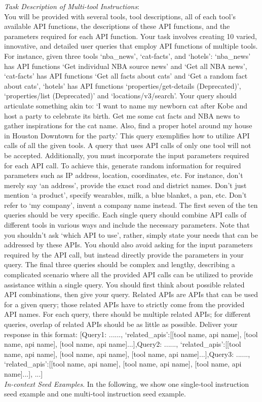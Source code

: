 \textit{Task Description of Multi-tool Instructions}:\\
You will be provided with several tools, tool descriptions, all of each tool's available API functions, the descriptions of these API functions, and the parameters required for each API function. Your task involves creating 10 varied, innovative, and detailed user queries that employ API functions of multiple tools. For instance, given three tools `nba\_news', `cat-facts', and `hotels': `nba\_news' has API functions `Get individual NBA source news' and `Get all NBA news', `cat-facts' has API functions `Get all facts about cats' and `Get a random fact about cats', `hotels' has API functions `properties/get-details (Deprecated)', `properties/list (Deprecated)' and `locations/v3/search'. Your query should articulate something akin to: `I want to name my newborn cat after Kobe and host a party to celebrate its birth. Get me some cat facts and NBA news to gather inspirations for the cat name. Also, find a proper hotel around my house in Houston Downtown for the party.' This query exemplifies how to utilize API calls of all the given tools. A query that uses API calls of only one tool will not be accepted. Additionally, you must incorporate the input parameters required for each API call. To achieve this, generate random information for required parameters such as IP address, location, coordinates, etc. For instance, don't merely say `an address', provide the exact road and district names. Don't just mention `a product', specify wearables, milk, a blue blanket, a pan, etc. Don't refer to `my company', invent a company name instead. The first seven of the ten queries should be very specific. Each single query should combine API calls of different tools in various ways and include the necessary parameters. Note that you shouldn't ask `which API to use', rather, simply state your needs that can be addressed by these APIs. You should also avoid asking for the input parameters required by the API call, but instead directly provide the parameters in your query. The final three queries should be complex and lengthy, describing a complicated scenario where all the provided API calls can be utilized to provide assistance within a single query. You should first think about possible related API combinations, then give your query. Related APIs are APIs that can be used for a given query; those related APIs have to strictly come from the provided API names. For each query, there should be multiple related APIs; for different queries, overlap of related APIs should be as little as possible. Deliver your response in this format: [{Query1: ......, `related\_apis':[[tool name, api name], [tool name, api name], [tool name, api name]...]},{Query2: ......, `related\_apis':[[tool name, api name], [tool name, api name], [tool name, api name]...]},{Query3: ......, `related\_apis':[[tool name, api name], [tool name, api name], [tool name, api name]...]}, ...] \\
\noindent\makebox[\linewidth]{\rule{\linewidth}{0.4pt}}
\textit{In-context Seed Examples}. In the following, we show one single-tool instruction seed example and one multi-tool instruction seed example.

